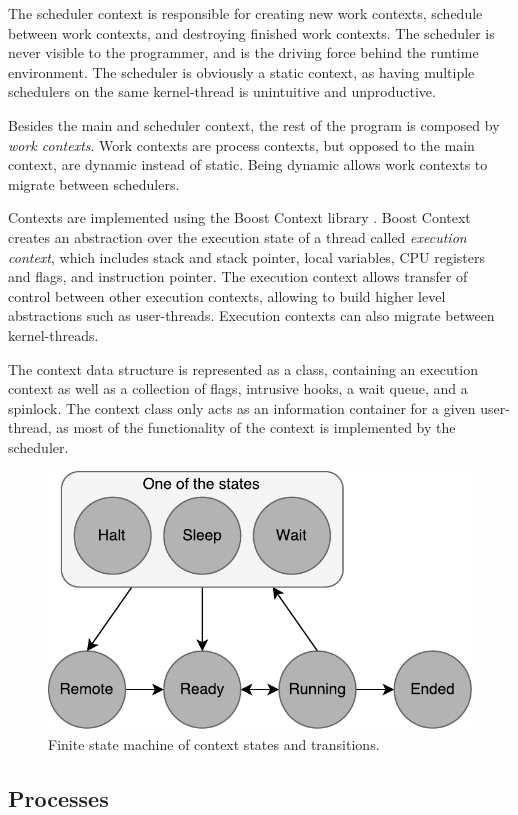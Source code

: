 The scheduler context is responsible for creating new work contexts, schedule between work contexts, and destroying finished work contexts. The scheduler is never visible to the programmer, and is the driving force behind the runtime environment. The scheduler is obviously a static context, as having multiple schedulers on the same kernel\hyp{}thread is unintuitive and unproductive.

Besides the main and scheduler context, the rest of the program is composed by \textit{work contexts}. Work contexts are process contexts, but opposed to the main context, are dynamic instead of static. Being dynamic allows work contexts to migrate between schedulers. 

Contexts are implemented using the Boost Context library \citep{kowalke2017boost}. Boost Context creates an abstraction over the execution state of a thread called \textit{execution context}, which includes stack and stack pointer, local variables, CPU registers and flags, and instruction pointer. The execution context allows transfer of control between other execution contexts, allowing to build higher level abstractions such as user\hyp{}threads. Execution contexts can also migrate between kernel\hyp{}threads.

The context data structure is represented as a class, containing an execution context as well as a collection of flags, intrusive hooks, a wait queue, and a spinlock. The context class only acts as an information container for a given user\hyp{}thread, as most of the functionality of the context is implemented by the scheduler.

\begin{figure}[h!]
    \centering
    \includegraphics[width=0.6\linewidth]{fig/context_states}
    \caption{Finite state machine of context states and transitions.}
    \label{fig:context_states}
\end{figure}


\FloatBarrier
\subsection{Processes}
\label{subsec:processes}

